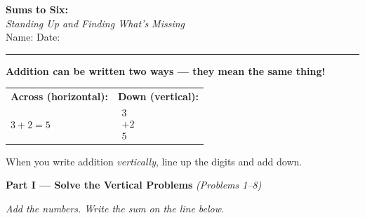 \documentclass[12pt, letterpaper]{article}
\newcommand{\answerline}{\underline{\hspace{2.5cm}}}
\newcommand{\biganswerline}{\underline{\hspace{4cm}}}
\newcommand{\vertadd}[3]{%
  \begin{array}{r}
    #1 \\
  + #2 \\
  \hline
    #3
  \end{array}
}
\begin{document}
\begin{center}
  {\LARGE\textbf{\textcolor{scholared}{Sums to Six:}}}\\[4pt]
  {\Large\textcolor{scholagold}{\textit{Standing Up and Finding What's Missing}}}\\[6pt]
  {\small Name: \biganswerline \hspace{1cm} Date: \answerline}
\end{center}

\vspace{4pt}
\noindent\textcolor{scholared}{\rule{\linewidth}{1pt}}
\vspace{4pt}


\begin{lessonbox}
\textbf{Addition can be written two ways — they mean the same thing!}\\[6pt]
\noindent
\begin{tabular}{@{}p{5cm} p{5cm}@{}}
\textbf{Across (horizontal):} & \textbf{Down (vertical):} \\[4pt]
$3 + 2 = 5$ &
$\displaystyle\vertadd{3}{2}{5}$
\end{tabular}

\medskip
\noindent When you write addition \emph{vertically}, line up the digits and add down.
\end{lessonbox}

\bigskip

\noindent\textcolor{scholared}{\large\textbf{Part I — Solve the Vertical Problems}} \hfill \textit{(Problems 1–8)}

\medskip
\noindent\textit{Add the numbers. Write the sum on the line below.}

\bigskip
\end{document}

